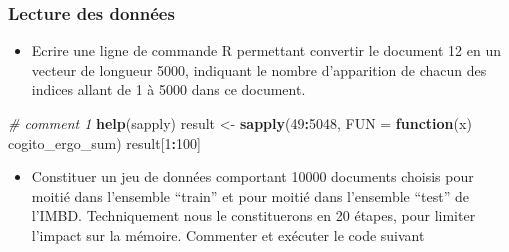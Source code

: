 \documentclass[]{article}
\newenvironment{Shaded}{\begin{snugshade}}{\end{snugshade}}
\newcommand{\KeywordTok}[1]{\textcolor[rgb]{0.13,0.29,0.53}{\textbf{#1}}}
\newcommand{\DataTypeTok}[1]{\textcolor[rgb]{0.13,0.29,0.53}{#1}}
\newcommand{\DecValTok}[1]{\textcolor[rgb]{0.00,0.00,0.81}{#1}}
\newcommand{\StringTok}[1]{\textcolor[rgb]{0.31,0.60,0.02}{#1}}
\newcommand{\CommentTok}[1]{\textcolor[rgb]{0.56,0.35,0.01}{\textit{#1}}}
\newcommand{\ControlFlowTok}[1]{\textcolor[rgb]{0.13,0.29,0.53}{\textbf{#1}}}
\newcommand{\OperatorTok}[1]{\textcolor[rgb]{0.81,0.36,0.00}{\textbf{#1}}}
\newcommand{\NormalTok}[1]{#1}
\providecommand{\tightlist}{%
  \setlength{\itemsep}{0pt}\setlength{\parskip}{0pt}}
\begin{document}
\subsubsection{Lecture des données}\label{lecture-des-donnees-1}

\begin{itemize}
\tightlist
\item
  Ecrire une ligne de commande R permettant convertir le document 12 en
  un vecteur de longueur 5000, indiquant le nombre d'apparition de
  chacun des indices allant de 1 à 5000 dans ce document.
\end{itemize}

\begin{Shaded}
\begin{Highlighting}[]
  \CommentTok{# comment 1}
  \KeywordTok{help}\NormalTok{(sapply)}
\NormalTok{  result <-}\StringTok{ }\KeywordTok{sapply}\NormalTok{(}\DecValTok{49}\OperatorTok{:}\DecValTok{5048}\NormalTok{, }\DataTypeTok{FUN =} \ControlFlowTok{function}\NormalTok{(x) cogito_ergo_sum)}
\NormalTok{  result[}\DecValTok{1}\OperatorTok{:}\DecValTok{100}\NormalTok{]}
\end{Highlighting}
\end{Shaded}

\begin{itemize}
\tightlist
\item
  Constituer un jeu de données comportant 10000 documents choisis pour
  moitié dans l'ensemble ``train'' et pour moitié dans l'ensemble
  ``test'' de l'IMBD. Techniquement nous le constituerons en 20 étapes,
  pour limiter l'impact sur la mémoire. Commenter et exécuter le code
  suivant
\end{itemize}
\end{document}
